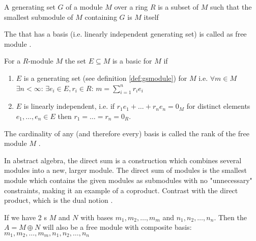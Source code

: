 \begin{appendices}
\begin{definition}
  A generating set $G$ of a module $M$ over a ring $R$ is a subset of
  $M$ such that the smallest submodule of $M$ containing $G$ is $M$
  itself \cite{wiki:gsmodule}
  \label{def:gsmodule}
\end{definition}

\begin{definition}
  The  that has a basis (i.e. linearly independent
  generating set) 
  is called as free module \cite{wiki:freemodule}.

  For a $R$-module $M$ the set $E \subseteq M$ is a basic for $M$ if
  \begin{enumerate}
  \item $E$ is a generating set (see definition \ref{def:gsmodule})
    for $M$ i.e. $\forall m \in M$ 
    $\exists n < \infty$: $\exists e_i \in E, r_i \in R$:
    $m = \sum_{i = 1}^n r_i e_i$
  \item $E$ is linearly independent, i.e. if $r_1 e_1 + \dots + r_n
    e_n = 0_M$ for distinct elements $e_1, \dots, e_n \in E$ then
    $r_1 = \dots = r_n = 0_R$.
  \end{enumerate}
  \label{def:freemodule}
\end{definition}

\begin{definition}
  The cardinality of any (and therefore every) basis is called the
  rank of the free module $M$ \cite{wiki:freemodule}.
  \label{def:rankfreemodule}
\end{definition}

\begin{definition}
  In abstract algebra, the direct sum is a construction which combines
  several modules into a new, larger module. The direct sum of modules
  is the smallest module which contains the given modules as
  submodules with no "unnecessary" constraints, making it an example
  of a coproduct. Contrast with the direct product, which is the dual
  notion \cite{wiki:directsummodules}.
  \label{def:directsummodules}
\end{definition}

\begin{example}
  If we have 2 s $M$ and $N$ with bases $m_1,
  m_2, \dots, m_m$ and $n_1, n_2, \dots, n_n$. Then the
   $A = M \oplus N$ will also be a free
  module with composite basis: $m_1, m_2, \dots, m_m, n_1, n_2, \dots, n_n$
  \label{ex:directsummodules}
\end{example}


\end{appendices}

